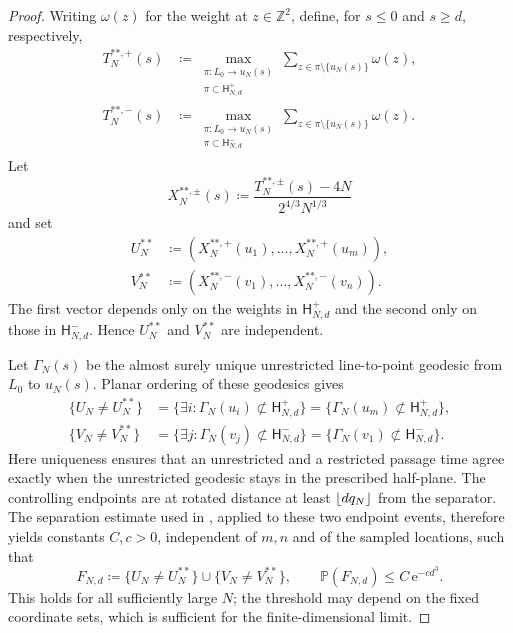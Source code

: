 \documentclass[12pt, reqno]{amsart}
\numberwithin{equation}{section}
\theoremstyle{definition}
\newcommand{\Z}{\mathbb{Z}}
\newcommand{\Prob}{\mathbb{P}}
\newcommand{\e}{\,\mathrm{e}}
\DeclarePairedDelimiter{\floor}{\lfloor}{\rfloor}
\begin{document}
\begin{proof}
  Writing $\omega(z)$ for the weight at $z\in\Z^2$, define, for $s\le0$ and
  $s\ge d$, respectively,
  \begin{align*}
    T_N^{**,+}(s)
      &\coloneqq
        \max_{\substack{\pi:L_0\to u_N(s)\\
                        \pi\subset\mathsf H^+_{N,d}}}
        \sum_{z\in\pi\setminus\{u_N(s)\}}\omega(z),\\
    T_N^{**,-}(s)
      &\coloneqq
        \max_{\substack{\pi:L_0\to u_N(s)\\
                        \pi\subset\mathsf H^-_{N,d}}}
        \sum_{z\in\pi\setminus\{u_N(s)\}}\omega(z).
  \end{align*}
  Let
  \[
    X_N^{**,\pm}(s)
    \coloneqq\frac{T_N^{**,\pm}(s)-4N}{2^{4/3}N^{1/3}}
  \]
  and set
  \begin{align*}
    U_N^{**}&\coloneqq
      (X_N^{**,+}(u_1),\ldots,X_N^{**,+}(u_m)),\\
    V_N^{**}&\coloneqq
      (X_N^{**,-}(v_1),\ldots,X_N^{**,-}(v_n)).
  \end{align*}
  The first vector depends only on the weights in $\mathsf H^+_{N,d}$ and the
  second only on those in $\mathsf H^-_{N,d}$. Hence $U_N^{**}$ and $V_N^{**}$
  are independent.

  Let $\Gamma_N(s)$ be the almost surely unique unrestricted line-to-point
  geodesic from $L_0$ to $u_N(s)$. Planar ordering of these geodesics gives
  \begin{align*}
    \{U_N\ne U_N^{**}\}
      &=\{\exists i:\Gamma_N(u_i)\not\subset\mathsf H^+_{N,d}\}
        =\{\Gamma_N(u_m)\not\subset\mathsf H^+_{N,d}\},\\
    \{V_N\ne V_N^{**}\}
      &=\{\exists j:\Gamma_N(v_j)\not\subset\mathsf H^-_{N,d}\}
        =\{\Gamma_N(v_1)\not\subset\mathsf H^-_{N,d}\}.
  \end{align*}
  Here uniqueness ensures that an unrestricted and a restricted passage time
  agree exactly when the unrestricted geodesic stays in the prescribed
  half-plane. The controlling endpoints are at rotated distance at least
  $\floor{dq_N}$ from the separator. The separation estimate used in
  \cite[Remark~1]{basu.bhattacharjee:24:limit}, applied to these two endpoint
  events, therefore yields constants $C,c>0$, independent of $m,n$ and of the
  sampled locations, such that
  \[
    F_{N,d}\coloneqq\{U_N\ne U_N^{**}\}\cup\{V_N\ne V_N^{**}\},\qquad
    \Prob(F_{N,d})\le C \e^{-c d^3}.
  \]
  This holds for all sufficiently large $N$; the threshold may depend on the
  fixed coordinate sets, which is sufficient for the finite-dimensional limit.


\end{proof}
\end{document}
